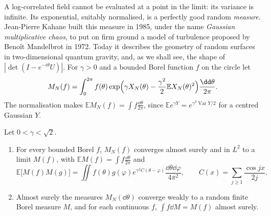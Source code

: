 A log-correlated field cannot be evaluated at a point in the limit: its variance is infinite. Its exponential, suitably normalised, is a perfectly good random \emph{measure}. Jean-Pierre Kahane built this measure in 1985, under the
name \emph{Gaussian multiplicative chaos}, to put on firm ground a model of turbulence proposed by Beno\^it Mandelbrot in 1972. Today it describes the geometry of random surfaces in two-dimensional quantum gravity, and, as we shall
see, the shape of $|\det(I-e^{-i\theta}U)|$. For $\gamma>0$ and a bounded Borel function $f$ on the circle let
\[
M_N(f)=\int_0^{2\pi}f(\theta)\exp\Bigl(\gamma X_N(\theta)-\frac{\gamma^2}2\mathbb EX_N(\theta)^2\Bigr)\frac{\dd\theta}{2\pi}.
\]
The normalisation makes $\mathbb EM_N(f)=\int f\frac{\dd\theta}{2\pi}$, since $\mathbb Ee^{\gamma Y}=e^{\gamma^2\operatorname{Var}Y/2}$ for a centred Gaussian $Y$.

\begin{theorem}\label{thm:gmc}
Let $0<\gamma<\sqrt2$.
\begin{enumerate}
\item For every bounded Borel $f$, $M_N(f)$ converges almost surely and in $L^2$ to a limit $M(f)$, with $\mathbb EM(f)=\int f\frac{\dd\theta}{2\pi}$ and
\[
\mathbb E\bigl[M(f)M(g)\bigr]=\iint f(\theta)g(\varphi)e^{\gamma^2C(\theta-\varphi)}\frac{\dd\theta\dd\varphi}{4\pi^2},\qquad C(x)=\sum_{j\ge1}\frac{\cos jx}{2j}.
\]
\item Almost surely the measures $M_N(\dd\theta)$ converge weakly to a random finite Borel measure $M$, and for each continuous $f$, $\int f\dd M=M(f)$ almost surely.
\end{enumerate}
\end{theorem}


